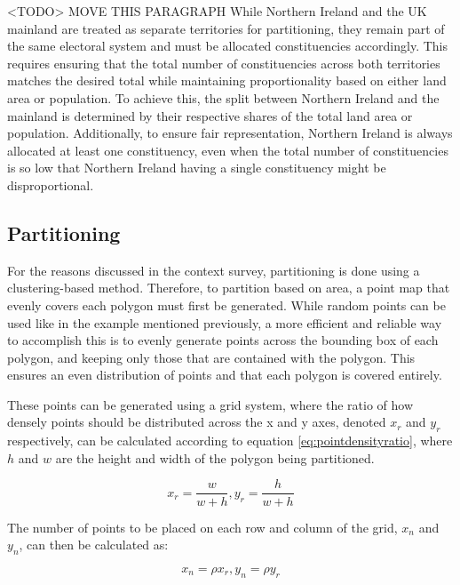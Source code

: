 \documentclass{article}
\begin{document}
<TODO> MOVE THIS PARAGRAPH
While Northern Ireland and the UK mainland are treated as separate territories for partitioning, they remain part of the same electoral system and must be allocated constituencies accordingly. 
This requires ensuring that the total number of constituencies across both territories matches the desired total while maintaining proportionality based on either land area or population. 
To achieve this, the split between Northern Ireland and the mainland is determined by their respective shares of the total land area or population. Additionally, to ensure fair representation, 
Northern Ireland is always allocated at least one constituency, even when the total number of constituencies is so low that Northern Ireland having a single constituency might be disproportional.

\subsection{Partitioning}

For the reasons discussed in the context survey, partitioning is done using a clustering-based method. Therefore, to partition based on area, a point map that evenly covers each polygon must
first be generated. While random points can be used like in the example mentioned previously, a more efficient and reliable way to accomplish this is
to evenly generate points across the bounding box of each polygon, and keeping only those that are contained with the polygon. This ensures an even distribution of points and that each polygon
is covered entirely. 

These points can be generated using a grid system, where the ratio of how densely points should be distributed across the x and y axes, denoted $x_r$ and $y_r$ respectively, 
can be calculated according to equation \ref{eq:pointdensityratio}, where $h$ and $w$ are the height and width of the polygon being partitioned.

\begin{equation}
    x_r = \frac{w}{w+h}, y_r = \frac{h}{w+h}
    \label{eq:pointdensityratio}
\end{equation}

The number of points to be placed on each row and column of the grid, $x_n$ and $y_n$, can then be calculated as:

\begin{equation}
    x_n = \rho x_r, y_n = \rho y_r
\end{equation}
\end{document}
